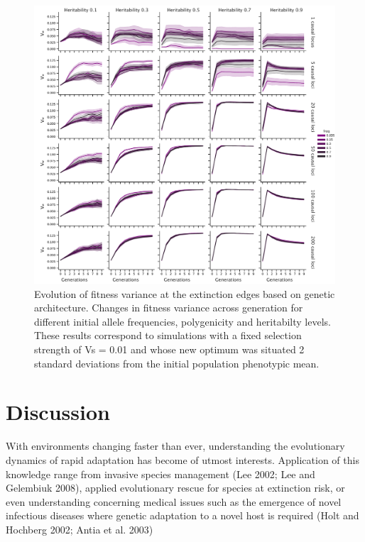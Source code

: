 \documentclass{article}
\begin{document}
\begin{figure}[H]
    \centering
    \includegraphics[width=1\textwidth]{figures/var_fitness_across_gen.pdf}
    \caption{Evolution of fitness variance at the extinction edges based on genetic architecture. Changes in fitness variance across generation for different initial allele frequencies, polygenicity and heritabilty levels. These results correspond to simulations with a fixed selection strength of Vs = 0.01 and whose new optimum was situated 2 standard deviations from the initial population phenotypic mean.}
    \label{fig:var_fitness_across_gen}
\end{figure}

\section{Discussion}

With environments changing faster than ever, understanding the evolutionary dynamics of rapid adaptation has become of utmost interests. Application of this knowledge range from invasive species management (Lee 2002; Lee and Gelembiuk 2008), applied evolutionary rescue for species at extinction risk, or even understanding concerning medical issues such as the emergence of novel infectious diseases where genetic adaptation to a novel host is required (Holt and Hochberg 2002; Antia et al. 2003)
\end{document}
